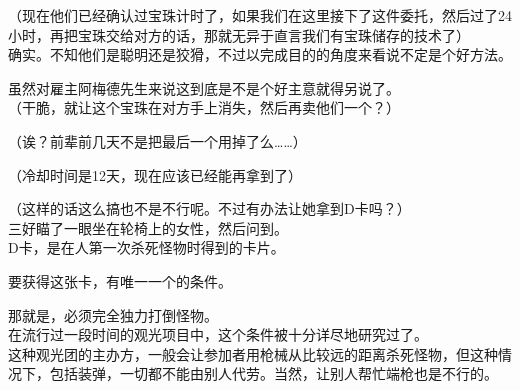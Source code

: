 （现在他们已经确认过宝珠计时了，如果我们在这里接下了这件委托，然后过了24小时，再把宝珠交给对方的话，那就无异于直言我们有宝珠储存的技术了）\\

确实。不知他们是聪明还是狡猾，不过以完成目的的角度来看说不定是个好方法。

虽然对雇主阿梅德先生来说这到底是不是个好主意就得另说了。\\

（干脆，就让这个宝珠在对方手上消失，然后再卖他们一个？）

（诶？前辈前几天不是把最后一个用掉了么……）

（冷却时间是12天，现在应该已经能再拿到了）

（这样的话这么搞也不是不行呢。不过有办法让她拿到D卡吗？）\\

三好瞄了一眼坐在轮椅上的女性，然后问到。\\

D卡，是在人第一次杀死怪物时得到的卡片。

要获得这张卡，有唯一一个的条件。

那就是，必须完全独力打倒怪物。\\

在流行过一段时间的观光项目中，这个条件被十分详尽地研究过了。\\

这种观光团的主办方，一般会让参加者用枪械从比较远的距离杀死怪物，但这种情况下，包括装弹，一切都不能由别人代劳。当然，让别人帮忙端枪也是不行的。

